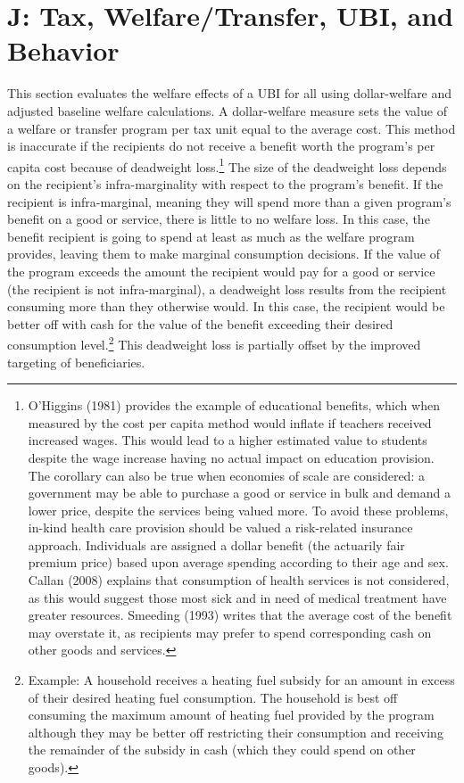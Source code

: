 \documentclass{article}
\begin{document}
\section{J: Tax, Welfare/Transfer, UBI, and Behavior}
This section evaluates the welfare effects of a UBI for all using dollar-welfare and adjusted baseline welfare calculations. A dollar-welfare measure sets the value of a welfare or transfer program per tax unit equal to the average cost. This method is inaccurate if the recipients do not receive a benefit worth the program’s per capita cost because of deadweight loss.\footnote{ O'Higgins (1981) provides the example of educational benefits, which when measured by the cost per capita method would inflate if teachers received increased wages. This would lead to a higher estimated value to students despite the wage increase having no actual impact on education provision. The corollary can also be true when economies of scale are considered: a government may be able to purchase a good or service in bulk and demand a lower price, despite the services being valued more. To avoid these problems, in-kind health care provision should be valued a risk-related insurance approach. Individuals are assigned a dollar benefit (the actuarily fair premium price) based upon average spending according to their age and sex. Callan (2008) explains that consumption of health services is not considered, as this would suggest those most sick and in need of medical treatment have greater resources. Smeeding (1993) writes that the average cost of the benefit may overstate it, as recipients may prefer to spend corresponding cash on other goods and services.} The size of the deadweight loss depends on the recipient’s infra-marginality with respect to the program’s benefit. If the recipient is infra-marginal, meaning they will spend more than a given program’s benefit on a good or service, there is little to no welfare loss. In this case, the benefit recipient is going to spend at least as much as the welfare program provides, leaving them to make marginal consumption decisions. If the value of the program exceeds the amount the recipient would pay for a good or service (the recipient is not infra-marginal), a deadweight loss results from the recipient consuming more than they otherwise would. In this case, the recipient would be better off with cash for the value of the benefit exceeding their desired consumption level.\footnote{Example: A household receives a heating fuel subsidy for an amount in excess of their desired heating fuel consumption. The household is best off consuming the maximum amount of heating fuel provided by the program although they may be better off restricting their consumption and receiving the remainder of the subsidy in cash (which they could spend on other goods).} This deadweight loss is partially offset by the improved targeting of beneficiaries.
\end{document}
